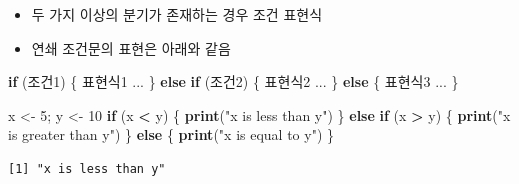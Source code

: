 \documentclass[
  11pt,
]{krantz}
\newenvironment{Shaded}{\begin{snugshade}}{\end{snugshade}}
\newcommand{\ControlFlowTok}[1]{\textcolor[rgb]{0.27,0.27,0.27}{\textbf{#1}}}
\newcommand{\DecValTok}[1]{\textcolor[rgb]{0.06,0.06,0.06}{#1}}
\newcommand{\KeywordTok}[1]{\textcolor[rgb]{0.27,0.27,0.27}{\textbf{#1}}}
\newcommand{\NormalTok}[1]{#1}
\newcommand{\OperatorTok}[1]{\textcolor[rgb]{0.43,0.43,0.43}{\textbf{#1}}}
\newcommand{\StringTok}[1]{\textcolor[rgb]{0.5,0.5,0.5}{#1}}
\providecommand{\tightlist}{%
  \setlength{\itemsep}{0pt}\setlength{\parskip}{0pt}}
\begin{document}
\begin{itemize}
\tightlist
\item
  두 가지 이상의 분기가 존재하는 경우 조건 표현식
\item
  연쇄 조건문의 표현은 아래와 같음
\end{itemize}

\footnotesize

\begin{Shaded}
\begin{Highlighting}[]
\ControlFlowTok{if}\NormalTok{ (조건1) \{}
\NormalTok{  표현식1 }
\NormalTok{  ...}
\NormalTok{\} }\ControlFlowTok{else} \ControlFlowTok{if}\NormalTok{ (조건2) \{}
\NormalTok{  표현식2}
\NormalTok{  ...}
\NormalTok{\} }\ControlFlowTok{else}\NormalTok{ \{}
\NormalTok{  표현식3 }
\NormalTok{  ...}
\NormalTok{\}}
\end{Highlighting}
\end{Shaded}

\normalsize

\footnotesize

\begin{Shaded}
\begin{Highlighting}[]
\NormalTok{x <-}\StringTok{ }\DecValTok{5}\NormalTok{; y <-}\StringTok{ }\DecValTok{10}
\ControlFlowTok{if}\NormalTok{ (x }\OperatorTok{<}\StringTok{ }\NormalTok{y) \{}
  \KeywordTok{print}\NormalTok{(}\StringTok{"x is less than y"}\NormalTok{)}
\NormalTok{\} }\ControlFlowTok{else} \ControlFlowTok{if}\NormalTok{ (x }\OperatorTok{>}\StringTok{ }\NormalTok{y) \{}
  \KeywordTok{print}\NormalTok{(}\StringTok{"x is greater than y"}\NormalTok{)}
\NormalTok{\} }\ControlFlowTok{else}\NormalTok{ \{}
  \KeywordTok{print}\NormalTok{(}\StringTok{"x is equal to y"}\NormalTok{)}
\NormalTok{\}}
\end{Highlighting}
\end{Shaded}

\begin{verbatim}
[1] "x is less than y"
\end{verbatim}

\normalsize

\footnotesize
\end{document}
